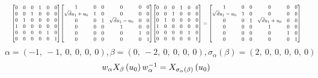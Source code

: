 \documentclass[11pt]{article}
\theoremstyle{definition}
\begin{document}
\[
\scaletoalign{\textwidth}{{\left[\begin{matrix}0 & 0 & 0 & 1 & 0 & 0\\0 & 0 & 1 & 0 & 0 & 0\\0 & 1 & 0 & 0 & 0 & 0\\1 & 0 & 0 & 0 & 0 & 0\\0 & 0 & 0 & 0 & 1 & 0\\0 & 0 & 0 & 0 & 0 & 1\end{matrix}\right]} {\left[\begin{matrix}1 & 0 & 0 & 0 & 0 & 0\\\sqrt{d} u_{1} + u_{0} & 1 & 0 & 0 & 0 & 0\\0 & 0 & 1 & \sqrt{d} u_{1} - u_{0} & 0 & 0\\0 & 0 & 0 & 1 & 0 & 0\\0 & 0 & 0 & 0 & 1 & 0\\0 & 0 & 0 & 0 & 0 & 1\end{matrix}\right]} {\left[\begin{matrix}0 & 0 & 0 & 1 & 0 & 0\\0 & 0 & 1 & 0 & 0 & 0\\0 & 1 & 0 & 0 & 0 & 0\\1 & 0 & 0 & 0 & 0 & 0\\0 & 0 & 0 & 0 & 1 & 0\\0 & 0 & 0 & 0 & 0 & 1\end{matrix}\right]} = {\left[\begin{matrix}1 & 0 & 0 & 0 & 0 & 0\\\sqrt{d} u_{1} - u_{0} & 1 & 0 & 0 & 0 & 0\\0 & 0 & 1 & \sqrt{d} u_{1} + u_{0} & 0 & 0\\0 & 0 & 0 & 1 & 0 & 0\\0 & 0 & 0 & 0 & 1 & 0\\0 & 0 & 0 & 0 & 0 & 1\end{matrix}\right]}}
\]
\[
\alpha = \left( -1, \  -1, \  0, \  0, \  0, \  0\right), \beta = \left( 0, \  -2, \  0, \  0, \  0, \  0\right), \sigma_{\alpha}(\beta) = \left( 2, \  0, \  0, \  0, \  0, \  0\right)
\]
\[
\scaletoalign{\textwidth}{w_{\alpha} X_{\beta}\left(u_{0}\right) w_{\alpha}^{-1} = X_{\sigma_{\alpha}\left(\beta\right)}\left(u_{0}\right)}
\]
\end{document}
